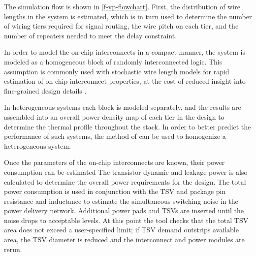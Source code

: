 \documentclass[journal,twoside]{IEEEtran}
\newcommand{\changed}[1]{\textcolor{red}{#1}}
\newcommand{\rechanged}[1]{\textcolor{red}{#1}}
\renewcommand{\rechanged}[1]{#1} %
\renewcommand{\changed}[1]{#1} %
\begin{document}
The simulation flow is shown in \cref{f-vp-flowchart}.
\changed{First, the distribution of 
wire lengths in the system is estimated, which is in turn used to determine the number of wiring tiers required for signal routing, 
the wire pitch on each tier, and the number of repeaters needed to meet the delay constraint.}
\changed{
In order to model the on-chip interconnects in a compact manner, the system is modeled as a homogeneous block
of randomly interconnected logic.
This assumption is commonly used with stochastic wire length models for rapid estimation of on-chip interconnect properties, at the cost of
reduced insight into fine-grained design details \cite{davis_stochastic_1998,joyner_impact_2001,sekar_intsim_2007}.
}
%
\changed{
In heterogeneous systems each block is modeled separately, 
and the results are assembled into an overall power density map of each tier in the design
to determine the thermal profile throughout the stack. In order to better predict the
performance of such systems, the method of \cite{zarkesh-ha_pin_1998} can be used to homogenize
a heterogeneous system.}



\changed{Once the parameters of the on-chip interconnects are known, their power consumption can be estimated
The transistor dynamic and leakage power is also calculated to determine the overall power requirements for the design.
The total power consumption is used in conjunction with the TSV and package pin resistance and inductance
to estimate the simultaneous switching noise in the power delivery network. Additional \rechanged{power pads and TSVs}
are inserted until the noise drops to acceptable levels.
At this point the tool checks that the total TSV area does not exceed a user-specified limit; 
if TSV demand outstrips available area, the TSV diameter is reduced and the interconnect and power modules are rerun.}
\end{document}
